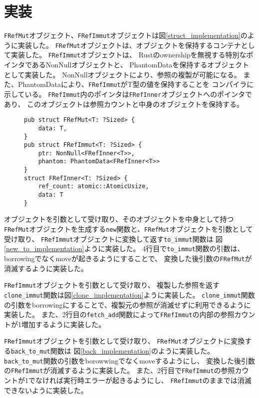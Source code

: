 \documentclass{sumiilab-paper}
\theoremstyle{mystyle}
\numberwithin{definition}{chapter} %
\begin{document}
\afterpage{\clearpage}
\newpage
\section{実装}
\texttt{FRefMut}オブジェクト、\texttt{FRefImmut}オブジェクトは図\ref{struct_implementation}のように実装した。
\texttt{FRefMut}オブジェクトは、オブジェクトを保持するコンテナとして実装した。
\texttt{FRefImmut}オブジェクトは、
Rustのownershipを無視する特別なポインタであるNonNullオブジェクトと、
PhantomDataを保持するオブジェクトとして実装した。
NonNullオブジェクトにより、参照の複製が可能になる。
また、PhantomDataにより、\texttt{FRefImmut}がT型の値を保持することを
コンパイラに示している。
\texttt{FRefImmut}内のポインタは\texttt{FRefInner}オブジェクトへのポインタであり、
このオブジェクトは参照カウントと中身のオブジェクトを保持する。
\begin{figure}[htp]
\begin{lstlisting}[caption=新たな参照オブジェクトの実装, label=struct_implementation, captionpos=b]
pub struct FRefMut<T: ?Sized> {
    data: T,
}
pub struct FRefImmut<T: ?Sized> {
    ptr: NonNull<FRefInner<T>>,
    phantom: PhantomData<FRefInner<T>>
}
struct FRefInner<T: ?Sized> {
    ref_count: atomic::AtomicUsize,
    data: T
}
\end{lstlisting}
\end{figure}

オブジェクトを引数として受け取り、そのオブジェクトを中身として持つ\texttt{FRefMut}オブジェクトを生成する\texttt{new}関数と、\texttt{FRefMut}オブジェクトを引数として受け取り、
\texttt{FRefImmut}オブジェクトに変換して返す\texttt{to\_immut}関数は
図\ref{new_to_implementation}ように実装した。
4行目で\texttt{to\_immut}関数の引数は、borrowingでなくmoveが起きるようにすることで、
変換した後引数の\texttt{FRefMut}が消滅するように実装した。

\texttt{FRefImmut}オブジェクトを引数として受け取り、
複製した参照を返す\texttt{clone\_immut}関数は図\ref{clone_implementation}ように実装した。
\texttt{clone\_immut}関数の引数をborrowingにすることで、複製元の参照が消滅せずに利用できるように実装した。
また、2行目の\texttt{fetch\_add}関数によって\texttt{FRefImmut}の内部の参照カウントが1増加するように実装した。

\texttt{FRefImmut}オブジェクトを引数として受け取り、
\texttt{FRefMut}オブジェクトに変換する\texttt{back\_to\_mut}関数は
図\ref{back_implementation}のように実装した。
\texttt{back\_to\_mut}関数の引数をborowwingでなくmoveするようにし、
変換した後引数の\texttt{FRefImmut}が消滅するように実装した。
また、2行目で\texttt{FRefImmut}の参照カウントが1でなければ実行時エラーが起きるようにし、
\texttt{FRefImmut}のままでは消滅できないように実装した。
\end{document}
